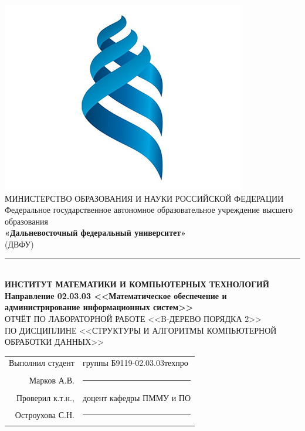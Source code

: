 \documentclass[a4paper]{article}
\newcommand{\group}{Б9119-02.03.03техпро}
\newcommand{\teachertitle}{доцент кафедры ПММУ и ПО}
\begin{document}
	\thispagestyle{fancy}

	\begin{center}
		\includegraphics[scale=0.15]{fefu-logo} \\
		\MakeUppercase{Министерство образования и науки Российской Федерации} \\
		Федеральное государственное автономное образовательное учреждение высшего образования \\
		\textbf{«Дальневосточный федеральный университет»} \\ (ДВФУ) \\
		\noindent\rule{\textwidth}{1pt} \\ [0.5cm]
		\textbf{
			\MakeUppercase{Институт математики и компьютерных технологий} \\ [0.5cm]
            Направление 02.03.03 <<Математическое обеспечение и администрирование информационных систем>>
		} \\ [1cm]
		\MakeUppercase{
			Отчёт по лабораторной работе <<B-дерево порядка 2>> \\ [0.5cm]
			по дисциплине <<Структуры и алгоритмы компьютерной обработки данных>> 
		} \\ [4cm]
	\end{center}

	\begin{flushright}
		\begin{tabular}{rl}
			Выполнил студент & группы \group                               \\ [0.1cm]
			Марков А.В.      & \rule{\widthof\teachertitle}{0.15mm} \\ [0.1cm]
			Проверил к.т.н., & \teachertitle                        \\ [0.1cm]
			Остроухова С.Н.  & \rule{\widthof\teachertitle}{0.15mm} \\
		\end{tabular}
	\end{flushright}
\end{document}
